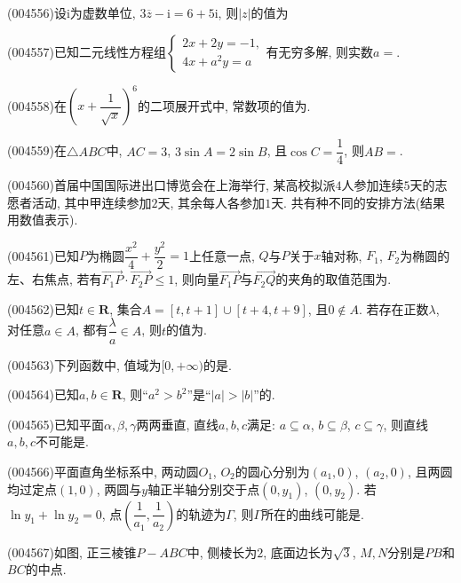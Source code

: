 \item (004556)设$\mathrm{i}$为虚数单位, $3\overline{z}-\mathrm{i}=6+5\mathrm{i}$, 则$|z|$的值为
\item (004557)已知二元线性方程组$\begin{cases}
    2x+2y=-1, \\ 4x+a^2y=a
\end{cases}$有无穷多解, 则实数$a=$.
\item (004558)在$(x+\dfrac{1}{\sqrt{x}})^6$的二项展开式中, 常数项的值为.
\item (004559)在$\triangle ABC$中, $AC=3$, $3\sin A=2\sin B$, 且$\cos C=\dfrac 14$, 则$AB=$.
\item (004560)首届中国国际进出口博览会在上海举行, 某高校拟派$4$人参加连续$5$天的志愿者活动, 其中甲连续参加$2$天, 其余每人各参加$1$天. 共有种不同的安排方法(结果用数值表示).
\item (004561)已知$P$为椭圆$\dfrac{x^2}{4}+\dfrac{y^2}2=1$上任意一点, $Q$与$P$关于$x$轴对称, $F_1$, $F_2$为椭圆的左、右焦点, 若有$\overrightarrow{F_1P}\cdot \overrightarrow{F_2P}\le 1$, 则向量$\overrightarrow{F_1P}$与$\overrightarrow{F_2Q}$的夹角的取值范围为.
\item (004562)已知$t\in \mathbf{R}$, 集合$A=[t,t+1]\cup [t+4,t+9]$, 且$0\not\in A$. 若存在正数$\lambda$, 对任意$a\in A$, 都有$\dfrac{\lambda}a\in A$, 则$t$的值为.
\item (004563)下列函数中, 值域为$[0,+\infty)$的是.
\item (004564)已知$a,b\in\mathbf{R}$, 则``$a^2>b^2$''是``$|a|>|b|$''的.
\item (004565)已知平面$\alpha,\beta,\gamma$两两垂直, 直线$a,b,c$满足: $a\subseteq \alpha$, $b\subseteq \beta$, $c\subseteq \gamma$, 则直线$a,b,c$不可能是.
\item (004566)平面直角坐标系中, 两动圆$O_1$, $O_2$的圆心分别为$(a_1,0)$, $(a_2,0)$, 且两圆均过定点$(1,0)$, 两圆与$y$轴正半轴分别交于点$(0,y_1)$, $(0,y_2)$. 若$\ln y_1+\ln y_2=0$, 点$(\dfrac{1}{a_1},\dfrac{1}{a_2})$的轨迹为$\Gamma$, 则$\Gamma$所在的曲线可能是.
\item (004567)如图, 正三棱锥$P-ABC$中, 侧棱长为$2$, 底面边长为$\sqrt{3}$, $M,N$分别是$PB$和$BC$的中点.
\begin{center}
\end{center}
